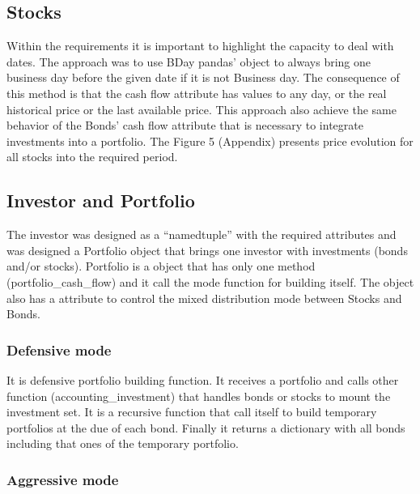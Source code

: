 \documentclass[
  11pt,
]{article}
\begin{document}
\hypertarget{stocks}{%
\subsection{Stocks}\label{stocks}}

Within the requirements it is important to highlight the capacity to deal with dates. The approach was to use BDay pandas' object to always bring one business day before the given date if it is not Business day. The consequence of this method is that the cash flow attribute has values to any day, or the real historical price or the last available price. This approach also achieve the same behavior of the Bonds' cash flow attribute that is necessary to integrate investments into a portfolio. The Figure 5 (Appendix) presents price evolution for all stocks into the required period.

\hypertarget{investor-and-portfolio}{%
\subsection{Investor and Portfolio}\label{investor-and-portfolio}}

The investor was designed as a ``namedtuple'' with the required attributes and was designed a Portfolio object that brings one investor with investments (bonds and/or stocks). Portfolio is a object that has only one method (portfolio\_cash\_flow) and it call the mode function for building itself. The object also has a attribute to control the mixed distribution mode between Stocks and Bonds.

\hypertarget{defensive-mode}{%
\subsubsection{Defensive mode}\label{defensive-mode}}

It is defensive portfolio building function. It receives a portfolio and calls other function (accounting\_investment) that handles bonds or stocks to mount the investment set. It is a recursive function that call itself to build temporary portfolios at the due of each bond. Finally it returns a dictionary with all bonds including that ones of the temporary portfolio.

\hypertarget{aggressive-mode}{%
\subsubsection{Aggressive mode}\label{aggressive-mode}}
\end{document}
